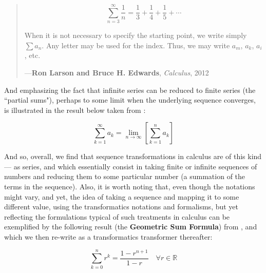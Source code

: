 \documentclass[a4paper, 18pt]{book} %
\begin{document}
\begin{appendices}
\begin{minipage}{1\textwidth}
\begin{quotation}
{\begin{equation}
\sum\limits^\infty_{n=3} \frac{1}{n} = \frac{1}{3} + \frac{1}{4} + \frac{1}{5} + \cdots
\end{equation}

When it is not necessary to specify the starting point, we write simply $\sum a_n$. Any letter may be used for the index. Thus, we may write $a_m$, $a_k$, $a_i$, etc.

}
\hspace*{\fill} ---\textbf{Ron Larson and Bruce H. Edwards}, \textit{Calculus}, 2012\cite{ronlarsoncalculus}
\end{quotation}
\vspace{1em}
\end{minipage}

\vspace{2em}


And emphasizing the fact that infinite series can be reduced to finite series (the ``partial sums"), perhaps to some limit when the underlying sequence converges, is illustrated in the result below taken from \cite{fitzpatrick1995advanced}:


\begin{equation}
\sum\limits^\infty_{k=1} a_k = \lim_{n \to \infty} \left[ \sum\limits^n_{k=1} a_k \right]
\end{equation}


\vspace{2em}


And so, overall, we find that sequence transformations in calculus are of this kind --- as series, and which essentially consist in taking finite or infinite sequences of numbers and reducing them to some particular number (a summation of the terms in the sequence). Also, it is worth noting that, even though the notations might vary, and yet, the idea of taking a sequence and mapping it to some different value, using the transformatics notations and formalisms, but yet reflecting the formulations typical of such treatments in calculus can be exemplified by the following result (the \textbf{Geometric Sum Formula}) from \cite{fitzpatrick1995advanced}, and which we then re-write as a transformatics transformer thereafter:

\vspace{2em}

\begin{equation}
\label{EQGEOMSERIES}
\sum\limits^n_{k=0} r^k = \frac{1 - r^{n+1}}{1 - r} \quad \forall r \in \mathbb{R}
\end{equation}


\end{appendices}
\end{document}
